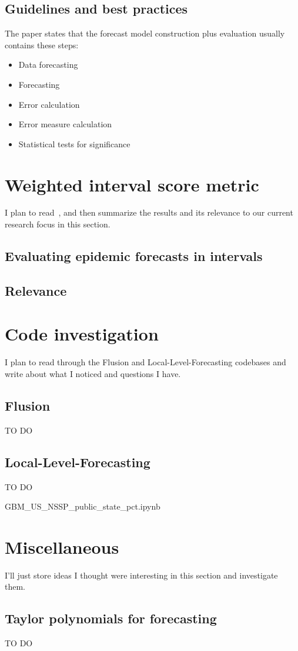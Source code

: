 \documentclass[12pt]{article}
\begin{document}
\subsection{Guidelines and best practices}
The paper states that the forecast model construction plus evaluation usually contains these steps:
\begin{itemize}
    \item Data forecasting
    \item Forecasting
    \item Error calculation
    \item Error measure calculation
    \item Statistical tests for significance
\end{itemize}



\section{Weighted interval score metric}
I plan to read~\cite{bracher21}, and then summarize the results and its relevance to our current research focus in this section.
\subsection{Evaluating epidemic forecasts in intervals}
\subsection{Relevance}

\section{Code investigation}
I plan to read through the Flusion and Local-Level-Forecasting codebases and write about what I noticed and questions I have.
\subsection{Flusion}
TO DO
\subsection{Local-Level-Forecasting}
TO DO

GBM\_US\_NSSP\_public\_state\_pct.ipynb

\section{Miscellaneous}
I'll just store ideas I thought were interesting in this section and investigate them.
\subsection{Taylor polynomials for forecasting}
TO DO


\printbibliography
\end{document}
